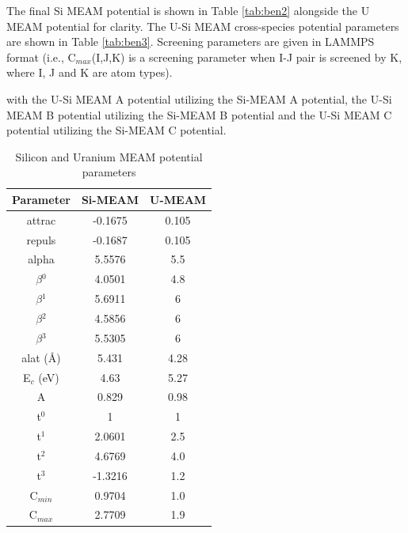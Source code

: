 \documentclass[review]{elsarticle}
\begin{document}
The final Si MEAM potential is shown in Table \ref{tab:ben2} alongside the U MEAM potential for clarity.  The U-Si MEAM cross-species potential parameters are shown in Table \ref{tab:ben3}.  Screening parameters are given in LAMMPS format (i.e., C$_{max}$(I,J,K) is a screening parameter when I-J pair is screened by K, where I, J and K are atom types).

 with the U-Si MEAM A potential utilizing the Si-MEAM A potential, the U-Si MEAM B potential utilizing the Si-MEAM B potential and the U-Si MEAM C potential utilizing the Si-MEAM C potential.    

\begin{table}[h]
\caption{Silicon and Uranium MEAM potential parameters}\label{tab:ben2}
\begin{center}
\begin{tabular}{|c|c|c|}
     \hline
     Parameter & Si-MEAM  & U-MEAM  \\
     \hline
     attrac & -0.1675 & 0.105  \\
     repuls & -0.1687 & 0.105 \\
     alpha & 5.5576 & 5.5   \\
     $\beta$$^{0}$ & 4.0501 & 4.8  \\
     $\beta$$^{1}$ & 5.6911 & 6  \\
     $\beta$$^{2}$ & 4.5856 & 6 \\  
     $\beta$$^{3}$ & 5.5305 & 6  \\
     alat (\AA) & 5.431 & 4.28  \\
     E$_{c}$ (eV) & 4.63 & 5.27 \\
     A & 0.829 & 0.98 \\
     t$^{0}$ & 1 & 1 \\
     t$^{1}$ & 2.0601 & 2.5  \\
     t$^{2}$ & 4.6769 & 4.0 \\
     t$^{3}$ & -1.3216 & 1.2  \\
     C$_{min}$ & 0.9704 & 1.0 \\ 
     C$_{max}$ & 2.7709 & 1.9  \\
     \hline
\end{tabular}
\end{center}
\label{default}
\end{table}%
\end{document}
